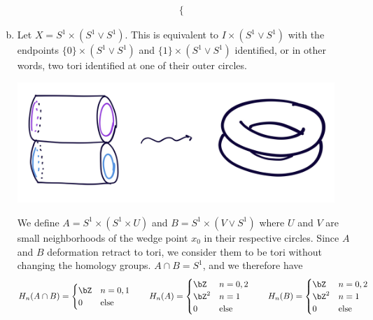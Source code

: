 \begin{homework}[e]
\begin{prf}
\begin{enumerate}[(a)]
\begin{align*}
\begin{cases}
      \end{cases}
    \end{align*}
    \item Let $X = S^1 \times (S^1 \vee S^1)$. This is equivalent to $I\times (S^1\vee S^1)$ with the endpoints $\{0\}\times (S^1\vee S^1)$ and $\{1\}\times (S^1\vee S^1)$ identified, or in other words, two tori identified at one of their outer circles.
    \begin{center}
      \includegraphics[width=12cm]{figures/hwk12-fig1.png}
      \label{fig:prob9-300}
    \end{center}
      We define $A = S^1 \times (S^1 \times U)$ and $B = S^1 \times (V \vee S^1)$ where $U$ and $V$ are small neighborhoods of the wedge point $x_0$ in their respective circles. Since $A$ and $B$ deformation retract to tori, we consider them to be tori without changing the homology groups. $A \cap B = S^1$, and we therefore have
        \begin{equation*}
        H_n(A\cap B) = 
        \begin{cases}
            \bZ & n=0,1 \\
            0 & \text{else} \\
        \end{cases}
        \hspace{2em}
        H_n(A) = 
        \begin{cases}
            \bZ & n=0,2 \\
            \bZ^2 & n=1 \\
            0 & \text{else} \\
        \end{cases}
        \hspace{2em}
        H_n(B) = 
        \begin{cases}
            \bZ & n=0,2 \\
            \bZ^2 & n=1 \\
            0 & \text{else} \\
        \end{cases}

\end{equation*}
\end{enumerate}
\end{prf}
\end{homework}
